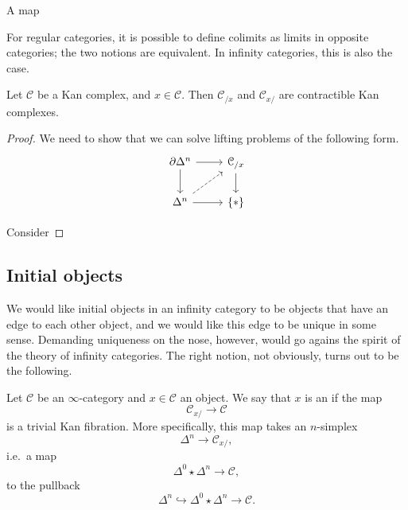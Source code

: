 \documentclass[main.tex]{subfiles}
\begin{document}
\begin{corollary}
  A map
\end{corollary}

For regular categories, it is possible to define colimits as limits in opposite categories; the two notions are equivalent. In infinity categories, this is also the case.

\begin{lemma}
  \label{lemma:under_over_categories_of_kan_complex_are_contractible}
  Let $\mathcal{C}$ be a Kan complex, and $x \in \mathcal{C}$. Then $\mathcal{C}_{/x}$ and $\mathcal{C}_{x/}$ are contractible Kan complexes.
\end{lemma}
\begin{proof}
  We need to show that we can solve lifting problems of the following form.
  \begin{equation*}
    \begin{tikzcd}
      \partial \Delta^{n}
      \arrow[r]
      \arrow[d]
      & \mathcal{C}_{/x}
      \arrow[d]
      \\
      \Delta^{n}
      \arrow[r]
      \arrow[ur, dashed]
      & \{*\}
    \end{tikzcd}
  \end{equation*}

  Consider
\end{proof}

\subsection{Initial objects}
\label{ssc:initial_objects}

We would like initial objects in an infinity category to be objects that have an edge to each other object, and we would like this edge to be unique in some sense. Demanding uniqueness on the nose, however, would go agains the spirit of the theory of infinity categories. The right notion, not obviously, turns out to be the following.

\begin{definition}
  \label{def:initial_object}
  Let $\mathcal{C}$ be an $\infty$-category and $x \in \mathcal{C}$ an object. We say that $x$ is an  if the map
  \begin{equation*}
    \mathcal{C}_{x/} \to \mathcal{C}
  \end{equation*}
  is a trivial Kan fibration. More specifically, this map takes an $n$-simplex
  \begin{equation*}
    \Delta^{n} \to \mathcal{C}_{x/},
  \end{equation*}
  i.e.\ a map
  \begin{equation*}
    \Delta^{0} \star \Delta^{n} \to \mathcal{C},
  \end{equation*}
  to the pullback
  \begin{equation*}
    \Delta^{n} \hookrightarrow \Delta^{0} \star \Delta^{n} \to \mathcal{C}.
  \end{equation*}
\end{definition}
\end{document}
